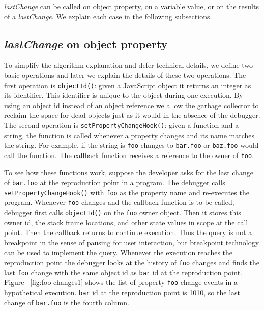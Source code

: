 \documentclass[runningheads,a4paper]{llncs}
\begin{document}
\textit{lastChange} can be called on object property, on a variable value, 
or on the results of a \textit{lastChange}. We explain each case in the following subsections.

\subsection{\textit{lastChange} on object property}
To simplify the algorithm explanation and defer technical details, we
define two basic operations and later we explain the details of these
two operations. The first operation is \texttt{objectId()}: given a
JavaScript object it returns an integer as its identifier. This
identifier is unique to the object during one execution.  By using an
object id instead of an object reference we allow the garbage
collector to reclaim the space for dead objects just as it would in the
absence of the debugger. The second
operation is \texttt{setPropertyChangeHook()}: given a function and a
string, the function is called whenever a property changes and its
name matches the string. For example, if the string is 
\texttt{foo} changes to \texttt{bar.foo} or \texttt{baz.foo} would
call the function.  The callback function receives a reference to the
owner of \texttt{foo}. 

To see how these functions work, suppose the developer asks for the
last change of \texttt{bar.foo} at the reproduction point in a
program. The debugger calls \texttt{setPropertyChangeHook()} with
\texttt{foo} as the property name and re-executes the
program. Whenever \texttt{foo} changes and the callback function is to
be called, debugger first calls \texttt{objectId()} on the
\texttt{foo} owner object. Then it stores this owner id, the stack
frame locations, and other state values in scope at the call point. 
Then the callback returns to continue execution. Thus the query is not 
a breakpoint in the sense of pausing for user interaction, but breakpoint 
technology can be used to implement the query.
Whenever the execution reaches the reproduction point the debugger
looks at the history of \texttt{foo} changes and finds the last
\texttt{foo} change with the same object id as \texttt{bar} id at the
reproduction point. Figure ~\ref{fig:foo-changes1} shows the list of
property \texttt{foo} change events in a hypothetical
execution. \texttt{bar} id at the reproduction point is 1010, so the
last change of \texttt{bar.foo} is the fourth column. 
\end{document}
